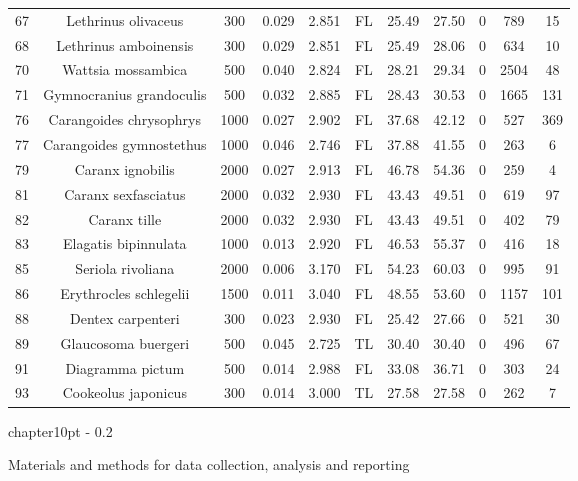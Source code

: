 \documentclass{report}\usepackage[]{graphicx}\usepackage[]{color}
\makeatletter
\renewcommand\chapter{\@startsection%
{chapter}{1}{0pt}%
{-\baselineskip}%
{0.2\baselineskip}%
{\raggedright\bf}}%
\makeatother
\begin{document}
\begin{table}[ht]
{\begin{tabular}{ccccccccccc}
  67 & Lethrinus olivaceus & 300 & 0.029 & 2.851 & FL & 25.49 & 27.50 & 0 & 789 & 15 \\ 
  68 & Lethrinus amboinensis & 300 & 0.029 & 2.851 & FL & 25.49 & 28.06 & 0 & 634 & 10 \\ 
  70 & Wattsia mossambica & 500 & 0.040 & 2.824 & FL & 28.21 & 29.34 & 0 & 2504 & 48 \\ 
  71 & Gymnocranius grandoculis & 500 & 0.032 & 2.885 & FL & 28.43 & 30.53 & 0 & 1665 & 131 \\ 
  76 & Carangoides chrysophrys & 1000 & 0.027 & 2.902 & FL & 37.68 & 42.12 & 0 & 527 & 369 \\ 
  77 & Carangoides gymnostethus & 1000 & 0.046 & 2.746 & FL & 37.88 & 41.55 & 0 & 263 & 6 \\ 
  79 & Caranx ignobilis & 2000 & 0.027 & 2.913 & FL & 46.78 & 54.36 & 0 & 259 & 4 \\ 
  81 & Caranx sexfasciatus & 2000 & 0.032 & 2.930 & FL & 43.43 & 49.51 & 0 & 619 & 97 \\ 
  82 & Caranx tille & 2000 & 0.032 & 2.930 & FL & 43.43 & 49.51 & 0 & 402 & 79 \\ 
  83 & Elagatis bipinnulata & 1000 & 0.013 & 2.920 & FL & 46.53 & 55.37 & 0 & 416 & 18 \\ 
  85 & Seriola rivoliana & 2000 & 0.006 & 3.170 & FL & 54.23 & 60.03 & 0 & 995 & 91 \\ 
  86 & Erythrocles schlegelii & 1500 & 0.011 & 3.040 & FL & 48.55 & 53.60 & 0 & 1157 & 101 \\ 
  88 & Dentex carpenteri & 300 & 0.023 & 2.930 & FL & 25.42 & 27.66 & 0 & 521 & 30 \\ 
  89 & Glaucosoma buergeri & 500 & 0.045 & 2.725 & TL & 30.40 & 30.40 & 0 & 496 & 67 \\ 
  91 & Diagramma pictum & 500 & 0.014 & 2.988 & FL & 33.08 & 36.71 & 0 & 303 & 24 \\ 
  93 & Cookeolus japonicus & 300 & 0.014 & 3.000 & TL & 27.58 & 27.58 & 0 & 262 & 7 \\ 
   \hline
\end{tabular}
}
\end{table}

\clearpage
\newpage

\chapter{Materials and methods for data collection, analysis and reporting}

\end{document}
